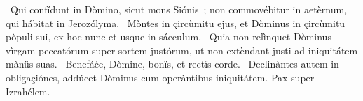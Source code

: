 ~Qui confídunt in Dòmino, sicut mons Siónis~; non commovébitur in aetèrnum, qui hábitat in Jerozólyma. 
~Mòntes in çircùmitu ejus, et Dòminus in çircùmitu pòpuli sui, ex hoc nunc et usque in sáeculum. 
~Quia non relìnquet Dòminus vìrgam peccatórum super sortem justórum, ut non extèndant justi ad iniquitátem mànüs suas. 
~Benefáċe, Dòmine, bonïs, et rectïs corde. 
~Declinàntes autem in obligaçiónes, addúcet Dòminus cum operàntibus iniquitátem. Pax super Izrahélem. 
